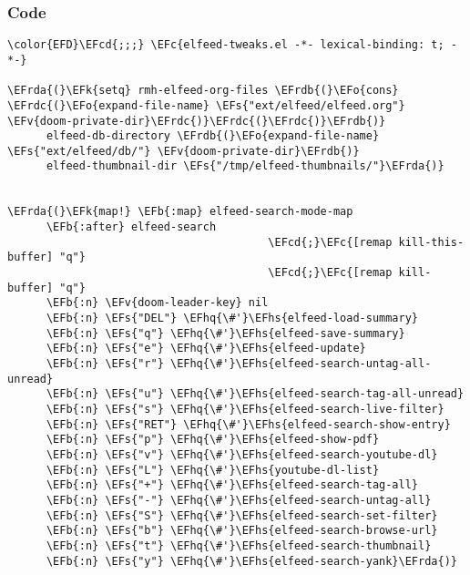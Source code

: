\documentclass[a4wide,10pt]{article}
\newcommand{\EFc}[1]{\textcolor{EFc}{#1}} %
\newcommand{\EFcd}[1]{\textcolor{EFcd}{#1}} %
\newcommand{\EFs}[1]{\textcolor{EFs}{#1}} %
\newcommand{\EFk}[1]{\textcolor{EFk}{#1}} %
\newcommand{\EFb}[1]{\textcolor{EFb}{#1}} %
\newcommand{\EFv}[1]{\textcolor{EFv}{#1}} %
\newcommand{\EFo}[1]{\textcolor{EFo}{#1}} %
\newcommand{\EFhq}[1]{\textcolor{EFhq}{#1}} %
\newcommand{\EFhs}[1]{\textcolor{EFhs}{#1}} %
\newcommand{\EFrda}[1]{\textcolor{EFrda}{#1}} %
\newcommand{\EFrdb}[1]{\textcolor{EFrdb}{#1}} %
\newcommand{\EFrdc}[1]{\textcolor{EFrdc}{#1}} %
\begin{document}
\subsubsection{Code}
\label{sec:org36993da}
\begin{Code}
\begin{Verbatim}
\color{EFD}\EFcd{;;;} \EFc{elfeed-tweaks.el -*- lexical-binding: t; -*-}

\EFrda{(}\EFk{setq} rmh-elfeed-org-files \EFrdb{(}\EFo{cons} \EFrdc{(}\EFo{expand-file-name} \EFs{"ext/elfeed/elfeed.org"} \EFv{doom-private-dir}\EFrdc{)}\EFrdc{(}\EFrdc{)}\EFrdb{)}
      elfeed-db-directory \EFrdb{(}\EFo{expand-file-name} \EFs{"ext/elfeed/db/"} \EFv{doom-private-dir}\EFrdb{)}
      elfeed-thumbnail-dir \EFs{"/tmp/elfeed-thumbnails/"}\EFrda{)}


\EFrda{(}\EFk{map!} \EFb{:map} elfeed-search-mode-map
      \EFb{:after} elfeed-search
                                        \EFcd{;}\EFc{[remap kill-this-buffer] "q"}
                                        \EFcd{;}\EFc{[remap kill-buffer] "q"}
      \EFb{:n} \EFv{doom-leader-key} nil
      \EFb{:n} \EFs{"DEL"} \EFhq{\#'}\EFhs{elfeed-load-summary}
      \EFb{:n} \EFs{"q"} \EFhq{\#'}\EFhs{elfeed-save-summary}
      \EFb{:n} \EFs{"e"} \EFhq{\#'}\EFhs{elfeed-update}
      \EFb{:n} \EFs{"r"} \EFhq{\#'}\EFhs{elfeed-search-untag-all-unread}
      \EFb{:n} \EFs{"u"} \EFhq{\#'}\EFhs{elfeed-search-tag-all-unread}
      \EFb{:n} \EFs{"s"} \EFhq{\#'}\EFhs{elfeed-search-live-filter}
      \EFb{:n} \EFs{"RET"} \EFhq{\#'}\EFhs{elfeed-search-show-entry}
      \EFb{:n} \EFs{"p"} \EFhq{\#'}\EFhs{elfeed-show-pdf}
      \EFb{:n} \EFs{"v"} \EFhq{\#'}\EFhs{elfeed-search-youtube-dl}
      \EFb{:n} \EFs{"L"} \EFhq{\#'}\EFhs{youtube-dl-list}
      \EFb{:n} \EFs{"+"} \EFhq{\#'}\EFhs{elfeed-search-tag-all}
      \EFb{:n} \EFs{"-"} \EFhq{\#'}\EFhs{elfeed-search-untag-all}
      \EFb{:n} \EFs{"S"} \EFhq{\#'}\EFhs{elfeed-search-set-filter}
      \EFb{:n} \EFs{"b"} \EFhq{\#'}\EFhs{elfeed-search-browse-url}
      \EFb{:n} \EFs{"t"} \EFhq{\#'}\EFhs{elfeed-search-thumbnail}
      \EFb{:n} \EFs{"y"} \EFhq{\#'}\EFhs{elfeed-search-yank}\EFrda{)}


\end{Verbatim}
\end{Code}
\end{document}
